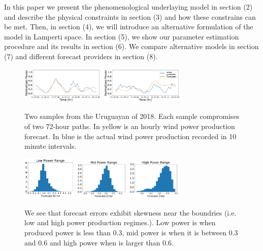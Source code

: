 \documentclass[10pt,twocolumn,letterpaper]{article}
\begin{document}
In this paper we present the phenomenological underlaying model in section (2) and describe the physical constraints in section (3) and how these constrains can be met. Then, in section (4), we will introduce an alternative formulation of the model in Lamperti space. In section (5), we show our parameter estimation procedure and its results in section (6). We compare alternative models in section (7) and different forecast providers in section (8).
\begin{figure}
  \includegraphics[width=40mm,scale=1]{plots/data_1516064400.pdf}
  \includegraphics[width=40mm,scale=1]{plots/data_1516323600.pdf}\\
  \caption{Two samples from the Uruguayan of 2018. Each sample compromises of two 72-hour paths. In yellow is an hourly wind power production forecast. In blue is the actual wind power production recorded in 10 minute intervals.}
  \label{fig:sample_data}
\end{figure}

\begin{figure}
  \includegraphics[width=26mm,scale=1]{plots/hist_low.pdf}
  \includegraphics[width=26mm,scale=1]{plots/hist_mid.pdf}
  \includegraphics[width=26mm,scale=1]{plots/hist_high.pdf}
  \caption{We see that forecast errors exhibit skewness near the boundries (i.e. low and high power production regimes.). Low power is when produced power is less than $0.3$, mid power is when it is between $0.3$ and $0.6$ and high power when is larger than $0.6$. }
  \label{fig:skew_data}
\end{figure}
\end{document}
